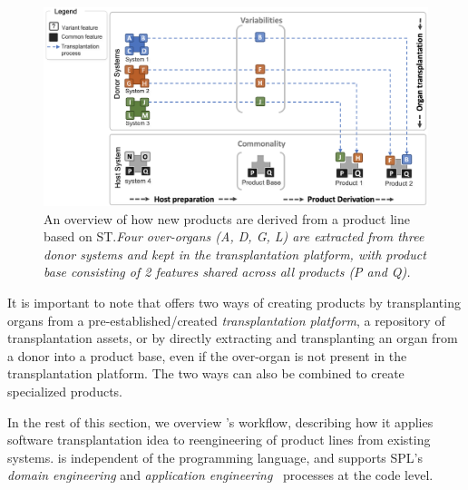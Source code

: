\begin{figure}[t]
	\centering \includegraphics[width=\textwidth]{images/product_for_transplantation7.png}
	\centering 
	\caption{An overview of how new products are derived from a product line based on ST.\textit{Four over-organs (A, D, G, L) are extracted from three donor systems and kept in the transplantation platform, with product base consisting of 2 features shared across all products (P and Q).}}
 
	\label{fig:product_for_transplantation}
\end{figure} 


It is important to note that \FOUNDRY offers two ways of creating products by transplanting organs from a pre-established/created \emph{transplantation platform}, a repository of transplantation assets, or by directly extracting and transplanting an organ from a donor into a product base, even if the over-organ is not present in the transplantation platform. The two ways can also be combined to create specialized products.

In the rest of this section, we overview \FOUNDRY's workflow, describing how it applies software transplantation idea to reengineering of product lines from existing systems. \FOUNDRY is independent of the programming language, and supports SPL's \emph{domain engineering} and \emph{application engineering}~\cite{Clements2001} processes at the code level.

